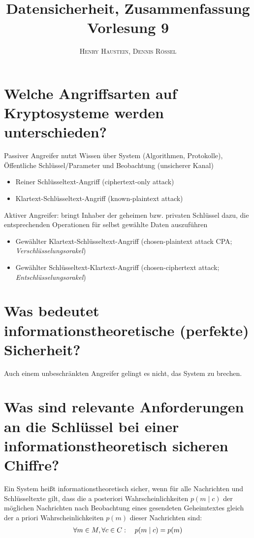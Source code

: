 \documentclass{article}
\title{\textbf{Datensicherheit, Zusammenfassung Vorlesung 9}}
\author{\textsc{Henry Haustein}, \textsc{Dennis Rössel}}
\date{}
\begin{document}
	\maketitle

	\section*{Welche Angriffsarten auf Kryptosysteme werden unterschieden?}
	Passiver Angreifer nutzt Wissen über System (Algorithmen, Protokolle), Öffentliche Schlüssel/Parameter und Beobachtung (unsicherer Kanal)
	\begin{itemize}
		\item Reiner Schlüsseltext-Angriff (ciphertext-only attack)
		\item Klartext-Schlüsseltext-Angriff (known-plaintext attack)
	\end{itemize}
	
	Aktiver Angreifer: bringt Inhaber der geheimen bzw. privaten Schlüssel dazu, die entsprechenden Operationen für selbst gewählte Daten auszuführen
	\begin{itemize}
		\item Gewählter Klartext-Schlüsseltext-Angriff (chosen-plaintext attack CPA; \textit{Verschlüsselungsorakel})
		\item Gewählter Schlüsseltext-Klartext-Angriff (chosen-ciphertext attack; \textit{Entschlüsselungsorakel})
	\end{itemize}
	
	\section*{Was bedeutet informationstheoretische (perfekte) Sicherheit?}
	Auch einem unbeschränkten Angreifer gelingt es nicht, das System zu brechen.
	
	\section*{Was sind relevante Anforderungen an die Schlüssel bei einer informationstheoretisch sicheren Chiffre?}
	Ein System heißt informationstheoretisch sicher, wenn für alle Nachrichten und Schlüsseltexte gilt, dass die a posteriori Wahrscheinlichkeiten $p(m\mid c)$ der möglichen Nachrichten nach Beobachtung eines gesendeten Geheimtextes gleich der a priori Wahrscheinlichkeiten $p(m)$ dieser Nachrichten sind:
	\begin{align}
		\forall m\in M, \forall c\in C:\quad p(m\mid c)=p(m) \notag
	\end{align}
	
\end{document}
